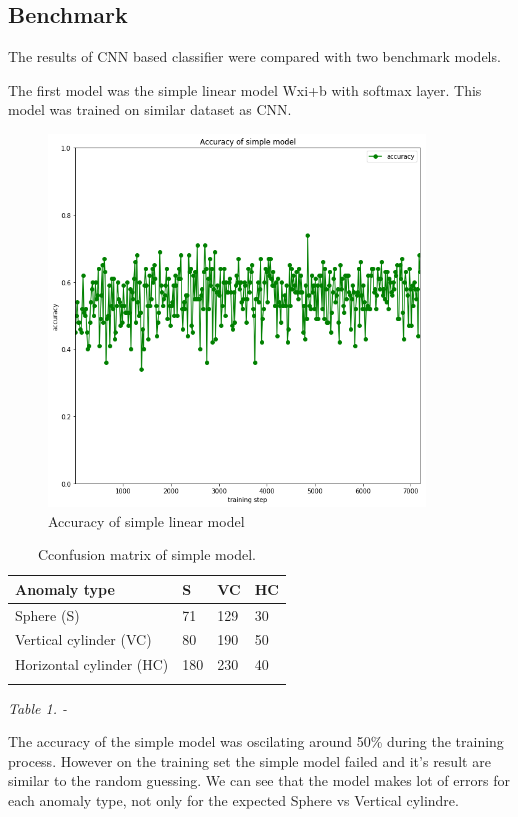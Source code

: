 \documentclass{article}
\begin{document}
\subsection{Benchmark}\label{benchmark}

The results of CNN based classifier were compared with two benchmark
models.

The first model was the simple linear model Wxi+b with softmax layer.
This model was trained on similar dataset as CNN.



\begin{figure}[!htp]
\centerline{\includegraphics[width=10cm]{img/simple_model_accuracy.png}}
\renewcommand{\figurename}{Figure}
\caption[Accuracy of simple linear model]{Accuracy of simple linear model}
\label{fig:HorizontalAnomalyExample}
\end{figure}


\begin{longtable}[c]{@{}llll@{}}
\toprule
Anomaly type & S & VC & HC\tabularnewline
\midrule
\endhead
Sphere (S) & 71 & 129 & 30\tabularnewline
Vertical cylinder (VC) & 80 & 190 & 50\tabularnewline
Horizontal cylinder (HC) & 180 & 230 & 40\tabularnewline
\bottomrule
\caption[Confusion matrix of simple model]{Cconfusion matrix of simple model.}
\label{tab:ConfusionMatrixSimpleModel}
\end{longtable}

\emph{Table 1. - }

The accuracy of the simple model was oscilating around 50\% during the
training process. However on the training set the simple model failed
and it's result are similar to the random guessing. We can see that the
model makes lot of errors for each anomaly type, not only for the
expected Sphere vs Vertical cylindre.
\end{document}
